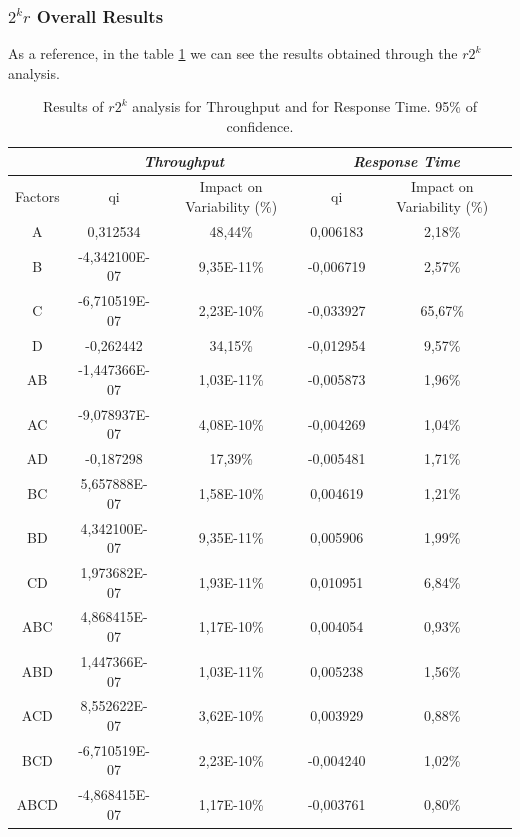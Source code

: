 \subsubsection{$2^kr$ Overall Results}
As a reference, in the table \ref{tab: 2kr_results} we can see the results obtained through the $r2^k$ analysis.
\begin{table}[H]
	\centering
	\begin{tabular}{|c|c|c|c|c|}
		\hline
		\textbf{} & \multicolumn{2}{c|}{\textit{\textbf{Throughput}}} & \multicolumn{2}{c|}{\textit{\textbf{Response Time}}} \\ \hline
		Factors   & qi          & Impact on Variability (\%)          & qi            & Impact on Variability (\%)           \\ \hline
		A    & 0,312534      & 48,44\%    & 0,006183  & 2,18\%  \\ \hline
		B    & -4,342100E-07 & 9,35E-11\% & -0,006719 & 2,57\%  \\ \hline
		C    & -6,710519E-07 & 2,23E-10\% & -0,033927 & 65,67\% \\ \hline
		D    & -0,262442     & 34,15\%    & -0,012954 & 9,57\%  \\ \hline
		AB   & -1,447366E-07 & 1,03E-11\% & -0,005873 & 1,96\%  \\ \hline
		AC   & -9,078937E-07 & 4,08E-10\% & -0,004269 & 1,04\%  \\ \hline
		AD   & -0,187298     & 17,39\%    & -0,005481 & 1,71\%  \\ \hline
		BC   & 5,657888E-07  & 1,58E-10\% & 0,004619  & 1,21\%  \\ \hline
		BD   & 4,342100E-07  & 9,35E-11\% & 0,005906  & 1,99\%  \\ \hline
		CD   & 1,973682E-07  & 1,93E-11\% & 0,010951  & 6,84\%  \\ \hline
		ABC  & 4,868415E-07  & 1,17E-10\% & 0,004054  & 0,93\%  \\ \hline
		ABD  & 1,447366E-07  & 1,03E-11\% & 0,005238  & 1,56\%  \\ \hline
		ACD  & 8,552622E-07  & 3,62E-10\% & 0,003929  & 0,88\%  \\ \hline
		BCD  & -6,710519E-07 & 2,23E-10\% & -0,004240 & 1,02\%  \\ \hline
		ABCD & -4,868415E-07 & 1,17E-10\% & -0,003761 & 0,80\%  \\ \hline
	\end{tabular}
	\caption{Results of $r2^k$ analysis for Throughput and for Response Time. 95\% of confidence.}
	\label{tab: 2kr_results}
\end{table}
																
